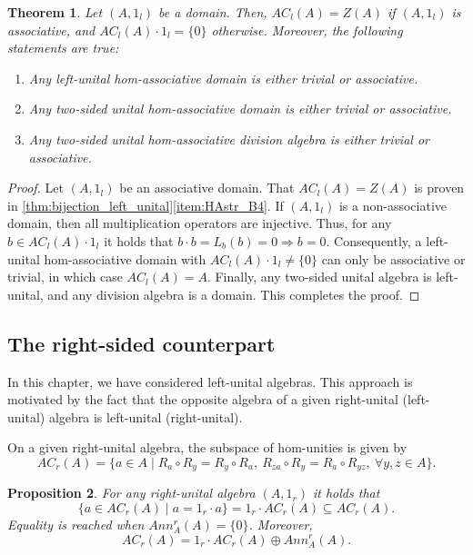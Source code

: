 \documentclass[12pt]{article}
\newtheorem{theorem}{Theorem}
\newtheorem{proposition}[theorem]{Proposition}
\begin{document}
		
		\begin{theorem}\label{thm:no_domains_L}
			Let $(A,1_l)$ be a domain. Then, $AC_l(A)= Z(A)$ if $(A,1_l)$ is associative, and $AC_l(A)\cdot 1_l=\{0\}$ otherwise. Moreover, the following statements are true:
			\begin{enumerate}[label=\textnormal{\arabic*)},ref=\textnormal{\arabic*)}]
				\item Any left-unital hom-associative domain is either trivial or associative.
				\item Any two-sided unital hom-associative domain is either trivial or associative.
				\item Any two-sided unital hom-associative division algebra is either trivial or associative.
			\end{enumerate}
		\end{theorem}
		\begin{proof}
			Let $(A,1_l)$ be an associative domain.  That $AC_l(A)= Z(A)$ is proven in \cref{thm:bijection_left_unital}\ref{item:HAstr_B4}. If $(A,1_l)$ is a non-associative domain, then all multiplication operators are injective. Thus, for any $b\in AC_l(A)\cdot 1_l$ it holds that $b\cdot b=L_b(b)=0\Rightarrow b=0$. Consequently, a left-unital hom-associative domain with $AC_l(A)\cdot 1_l\neq\{0\}$ can only be associative or trivial, in which case $AC_l(A)=A$. Finally, any two-sided unital algebra is left-unital, and any division algebra is a domain. This completes the proof.
		\end{proof}
		
		
		\subsection{The right-sided counterpart}\label{ssec:right-sided-unital}
		
		In this chapter, we have considered left-unital algebras. This approach is motivated by the fact that the opposite algebra of a given right-unital (left-unital) algebra  is left-unital (right-unital).
		
		On a given right-unital algebra, the subspace of hom-unities is given by
		\begin{equation*}
			AC_r(A)=\{a\in A \mid R_a\circ R_y=R_y\circ R_a,\ R_{za}\circ R_{y}=R_{a}\circ R_{yz},\ \forall y,z\in A  \}.
		\end{equation*}
		\begin{proposition}
			For any right-unital algebra $(A,1_r)$ it holds that
			\begin{equation*}
				\{a\in AC_r(A)\mid a=1_r\cdot a\}=1_r\cdot AC_r(A)\subseteq AC_r(A).
			\end{equation*}
			Equality is reached when $Ann_ A ^r(A)=\{0\}$. Moreover,
			\begin{equation*}
				AC_r(A)=1_r\cdot AC_r(A)\oplus Ann_A^r(A).
			\end{equation*}
		\end{proposition}
		
\end{document}
